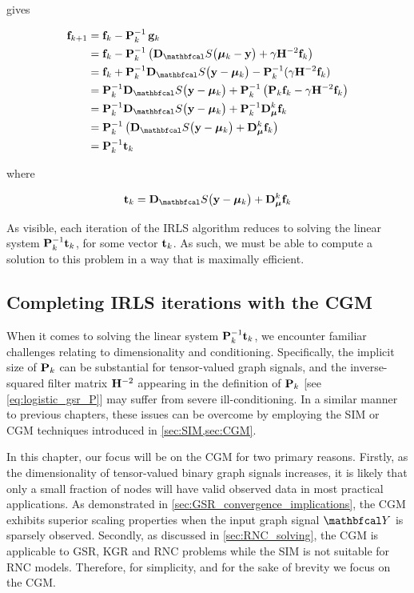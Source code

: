 gives

\begin{align*}
    \f_{k+1} &= \f_k - \PP^{-1}_k \, \g_k\\
    &= \f_{k} - \PP^{-1}_k \left(\D_\St \big(\muu_k - \y\big) + \gamma \HH^{-2} \f_k\right) \\
    &= \f_k + \PP^{-1}_k \D_\St \big(\y - \muu_k\big) - \PP^{-1}_k (\gamma \HH^{-2} \f_k) \\
    &= \PP^{-1}_k \D_\St \big(\y - \muu_k \big) + \PP^{-1}_k \left(\PP_k \f_k - \gamma \HH^{-2} \f_k\right) \\
    &= \PP^{-1}_k \D_\St \big(\y - \muu_k \big) + \PP^{-1}_k \D_{\muu}^k\f_k  \\
    &= \PP^{-1}_k \left(\D_\St \big(\y - \muu_k \big) + \D_{\muu}^k\f_k \right) \\
    &= \PP^{-1}_k \tee_k
\end{align*}

where

\begin{equation}
    \tee_k = \D_\St \big(\y - \muu_k\big) + \D_{\muu}^k \f_k
\end{equation}

As visible, each iteration of the IRLS algorithm reduces to solving the linear system $\mathbf{P}^{-1}_k \mathbf{t}_k$, for some vector $\mathbf{t}_k$. As such, we must be able to compute a solution to this problem in a way that is maximally efficient. 


\subsection{Completing IRLS iterations with the CGM}

When it comes to solving the linear system $\mathbf{P}^{-1}_k \mathbf{t}_k$, we encounter familiar challenges relating to dimensionality and conditioning. Specifically, the implicit size of $\mathbf{P}_k$ can be substantial for tensor-valued graph signals, and the inverse-squared filter matrix $\mathbf{H}^{-2}$ appearing in the definition of $\mathbf{P}_k$ [see \cref{eq:logistic_gsr_P}] may suffer from severe ill-conditioning. In a similar manner to previous chapters, these issues can be overcome by employing the SIM or CGM techniques introduced in \cref{sec:SIM,sec:CGM}.

In this chapter, our focus will be on the CGM for two primary reasons. Firstly, as the dimensionality of tensor-valued binary graph signals increases, it is likely that only a small fraction of nodes will have valid observed data in most practical applications. As demonstrated in \cref{sec:GSR_convergence_implications}, the CGM exhibits superior scaling properties when the input graph signal $\Yt$ is sparsely observed. Secondly, as discussed in \cref{sec:RNC_solving}, the CGM is applicable to GSR, KGR and RNC problems while the SIM is not suitable for RNC models. Therefore, for simplicity, and for the sake of brevity we focus on the CGM. 

